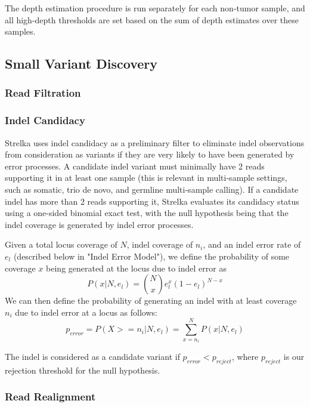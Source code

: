 \documentclass{article}
\begin{document}
The depth estimation procedure is run separately for each non-tumor sample, and all high-depth thresholds are set based on the sum of depth estimates over these samples.

\subsection{Small Variant Discovery}

\subsubsection{Read Filtration}

\subsubsection{Indel Candidacy}

Strelka uses indel candidacy as a preliminary filter to eliminate indel observations from consideration as variants if they are very likely to have been generated by error processes.  A candidate indel variant must minimally have 2 reads supporting it in at least one sample (this is relevant in multi-sample settings, such as somatic, trio de novo, and germline multi-sample calling).  If a candidate indel has more than 2 reads supporting it, Strelka evaluates its candidacy status using a one-sided binomial exact test, with the null hypothesis being that the indel coverage is generated by indel error processes.

Given a total locus coverage of $N$, indel coverage of $n_i$, and an indel error rate of $e_l$ (described below in "Indel Error Model"), we define the probability of some coverage $x$ being generated at the locus due to indel error as
\begin{equation*}
P(x | N, e_l) = \binom {N} {x} e^{x}_l (1 - e_l)^{N - x}
\end{equation*}
We can then define the probability of generating an indel with at least coverage $n_i$ due to indel error at a locus as follows:
\begin{equation*}
p_{error} = P(X >= n_i | N, e_l) = \sum_{x = n_i}^{N} P(x | N, e_l)
\end{equation*}

\noindent The indel is considered as a candidate variant if $p_{error} < p_{reject}$, where $p_{reject}$ is our rejection threshold for the null hypothesis.

\subsubsection{Read Realignment}
\end{document}
